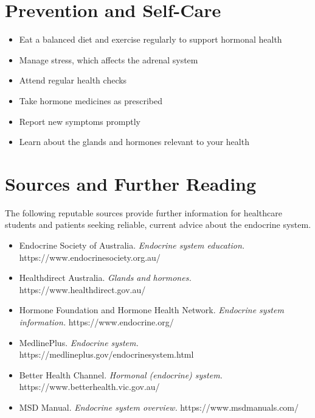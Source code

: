 \section*{Prevention and Self-Care}
\begin{itemize}
    \item Eat a balanced diet and exercise regularly to support hormonal health
    \item Manage stress, which affects the adrenal system
    \item Attend regular health checks
    \item Take hormone medicines as prescribed
    \item Report new symptoms promptly
    \item Learn about the glands and hormones relevant to your health
\end{itemize}

\section*{Sources and Further Reading}
The following reputable sources provide further information for healthcare students and patients seeking reliable, current advice about the endocrine system.
\begin{itemize}
    \item Endocrine Society of Australia. \textit{Endocrine system education.} https://www.endocrinesociety.org.au/
    \item Healthdirect Australia. \textit{Glands and hormones.} https://www.healthdirect.gov.au/
    \item Hormone Foundation and Hormone Health Network. \textit{Endocrine system information.} https://www.endocrine.org/
    \item MedlinePlus. \textit{Endocrine system.} https://medlineplus.gov/endocrinesystem.html
    \item Better Health Channel. \textit{Hormonal (endocrine) system.} https://www.betterhealth.vic.gov.au/
    \item MSD Manual. \textit{Endocrine system overview.} https://www.msdmanuals.com/
\end{itemize}
